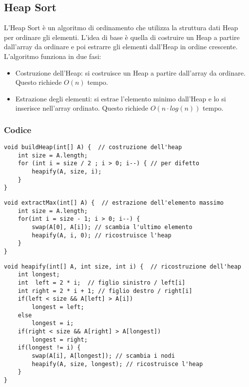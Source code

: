 \documentclass[a4paper,12pt]{article}
\begin{document}
                    \subsection{Heap Sort}
L'Heap Sort è un algoritmo di ordinamento che utilizza la struttura dati Heap per ordinare gli elementi. L'idea di base è quella di costruire un Heap a partire dall'array da ordinare e poi estrarre gli elementi dall'Heap in ordine crescente. \\
L'algoritmo funziona in due fasi:
\begin{itemize}
    \item Costruzione dell'Heap: si costruisce un Heap a partire dall'array da ordinare. Questo richiede $O(n)$ tempo.
    \item Estrazione degli elementi: si estrae l'elemento minimo dall'Heap e lo si inserisce nell'array ordinato. Questo richiede $O(n \cdot log(n))$ tempo.
\end{itemize}

\subsubsection{\textcolor{codice}{Codice}}
\begin{lstlisting}[style=mystyle]
void buildHeap(int[] A) {  // costruzione dell'heap
    int size = A.length;
    for (int i = size / 2 ; i > 0; i--) { // per difetto
        heapify(A, size, i);
    }
}
\end{lstlisting}

\begin{lstlisting}[style=mystyle]
void extractMax(int[] A) {  // estrazione dell'elemento massimo
    int size = A.length;
    for(int i = size - 1; i > 0; i--) {
        swap(A[0], A[i]); // scambia l'ultimo elemento
        heapify(A, i, 0); // ricostruisce l'heap
    }
}
\end{lstlisting}

\begin{lstlisting}[style=mystyle]
void heapify(int[] A, int size, int i) {  // ricostruzione dell'heap
    int longest;
    int  left = 2 * i;  // figlio sinistro / left[i]
    int right = 2 * i + 1; // figlio destro / right[i]
    if(left < size && A[left] > A[i])  
        longest = left;
    else  
        longest = i;
    if(right < size && A[right] > A[longest]) 
        longest = right;
    if(longest != i) {
        swap(A[i], A[longest]); // scambia i nodi
        heapify(A, size, longest); // ricostruisce l'heap
    }
}
\end{lstlisting}
\end{document}
